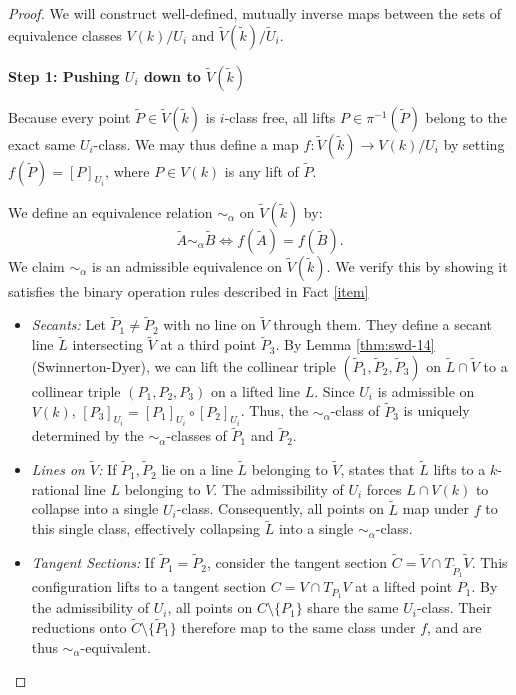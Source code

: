 \documentclass[11pt]{article}
\theoremstyle{definition}
\begin{document}
\begin{proof}
We will construct well-defined, mutually inverse maps between the sets of equivalence classes $V(k)/U_i$ and $\tilde{V}(\tilde{k})/\tilde{U}_i$.

\vspace{0.5em}
\noindent\textbf{Step 1: Pushing $U_i$ down to $\tilde{V}(\tilde{k})$}

Because every point $\tilde{P} \in \tilde{V}(\tilde{k})$ is $i$-class free, all lifts $P \in \pi^{-1}(\tilde{P})$ belong to the exact same $U_i$-class. We may thus define a map $f: \tilde{V}(\tilde{k}) \to V(k)/U_i$ by setting $f(\tilde{P}) = [P]_{U_i}$, where $P \in V(k)$ is any lift of $\tilde{P}$. 

We define an equivalence relation $\sim_\alpha$ on $\tilde{V}(\tilde{k})$ by:
\[ \tilde{A} \sim_\alpha \tilde{B} \iff f(\tilde{A}) = f(\tilde{B}). \]
We claim $\sim_\alpha$ is an admissible equivalence on $\tilde{V}(\tilde{k})$. We verify this by showing it satisfies the binary operation rules described in Fact \ref{item}
\begin{itemize}
    \item \textit{Secants:} Let $\tilde{P}_1 \neq \tilde{P}_2$ with no line on $\tilde{V}$ through them. They define a secant line $\tilde{L}$ intersecting $\tilde{V}$ at a third point $\tilde{P}_3$. By Lemma \ref{thm:swd-14} (Swinnerton-Dyer), we can lift the collinear triple $(\tilde{P}_1, \tilde{P}_2, \tilde{P}_3)$ on $\tilde{L} \cap \tilde{V}$ to a collinear triple $(P_1, P_2, P_3)$ on a lifted line $L$. Since $U_i$ is admissible on $V(k)$, $[P_3]_{U_i} = [P_1]_{U_i} \circ [P_2]_{U_i}$. Thus, the $\sim_\alpha$-class of $\tilde{P}_3$ is uniquely determined by the $\sim_\alpha$-classes of $\tilde{P}_1$ and $\tilde{P}_2$.
    \item \textit{Lines on $\tilde{V}$:} If $\tilde{P}_1, \tilde{P}_2$ lie on a line $\tilde{L}$ belonging to $\tilde{V}$,  states that $\tilde{L}$ lifts to a $k$-rational line $L$ belonging to $V$. The admissibility of $U_i$ forces $L \cap V(k)$ to collapse into a single $U_i$-class. Consequently, all points on $\tilde{L}$ map under $f$ to this single class, effectively collapsing $\tilde{L}$ into a single $\sim_\alpha$-class.
    \item \textit{Tangent Sections:} If $\tilde{P}_1 = \tilde{P}_2$, consider the tangent section $\tilde{C} = \tilde{V} \cap T_{\tilde{P}_1}\tilde{V}$. This configuration lifts to a tangent section $C = V \cap T_{P_1}V$ at a lifted point $P_1$. By the admissibility of $U_i$, all points on $C \setminus \{P_1\}$ share the same $U_i$-class. Their reductions onto $\tilde{C} \setminus \{\tilde{P}_1\}$ therefore map to the same class under $f$, and are thus $\sim_\alpha$-equivalent.
\end{itemize}


\end{proof}
\end{document}
